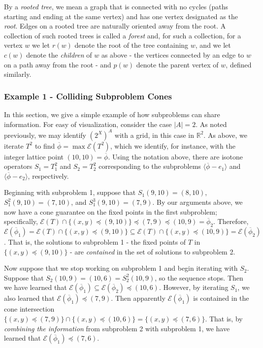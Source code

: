 \documentclass[11pt,reqno]{amsart}
\theoremstyle{definition}
\numberwithin{equation}{section}
\newcommand{\mr}{\mathbb{R}}
\newcommand{\ol}{\overline}
\newcommand{\lag}{\langle}
\newcommand{\rag}{\rangle}
\newcommand{\pre}{\phi}
\newcommand{\prealloc}{(2^X)^A}
\newcommand{\sub}{\subseteq}
\newcommand{\fix}{\mathcal{E}}
\newcommand{\peq}{\preceq}
\newcommand{\toppre}{\ol{\pre}}
\begin{document}
By a \emph{rooted tree}, we mean a graph that is connected with no cycles (paths starting and ending at the same vertex) and has one vertex designated as the \emph{root}. 
Edges on a rooted tree are naturally oriented away from the root. 
A collection of such rooted trees is called a \emph{forest} and, for such a collection, for a vertex $w$ we let $r(w)$ denote the root of the tree containing $w$, and we let $c(w)$ denote the \emph{children} of $w$ as above - the vertices connected by an edge to $w$ on a path away from the root - and $p(w)$ denote the parent vertex of $w$, defined similarly.  

\subsubsection{Example 1 - Colliding Subproblem Cones}
In this section, we give a simple example of how subproblems can share information.
For easy of visualization, consider the case $|A| = 2$. As noted previously, we may identify $\prealloc$ with a grid, in this case in $\mr^2$.
As above, we iterate $T^2$ to find $\toppre = \max \fix(T^2)$, which we identify, for instance, with the integer lattice point $(10,10) = \toppre$. 
Using the notation above, there are isotone operators $S_1 = T_1^2$ and $S_2 = T_2^2$ corresponding to the subproblems $\lag \toppre - e_1 \rag$ and $\lag \toppre - e_2 \rag$, respectively. 

Beginning with subproblem 1, suppose that $S_1 (9,10) = (8,10)$, $S_1^2 (9,10) = (7,10)$, and $S_1^3 (9,10) = (7,9)$.
By our arguments above, we now have a cone guarantee on the fixed points in the first subproblem; specifically, $\fix(T) \cap \{(x,y) \peq (9,10)\} \peq (7,9) \peq (10,9) = \toppre_2$.
Therefore, $\fix(\toppre_1) = \fix(T) \cap \{(x,y) \peq (9,10)\} \sub \fix(T) \cap \{(x,y) \peq (10,9)\} = \fix(\toppre_2)$. 
That is, the solutions to subproblem 1 - the fixed points of $T$ in $\{(x,y) \peq (9,10)\}$ - are \emph{contained} in the set of solutions to subproblem 2.  

Now suppose that we stop working on subproblem 1 and begin iterating with $S_2$.
Suppose that $S_2(10,9) = (10,6) = S_2^2(10,9)$, so the sequence stops.
Then we have learned that $\fix(\toppre_1) \sub \fix(\toppre_2) \peq (10,6)$. 
However, by iterating $S_1$, we also learned that $\fix(\toppre_1) \peq (7,9)$. 
Then apparently $\fix(\toppre_1)$ is contained in the cone intersection $\{(x,y) \peq (7,9)\} \cap \{(x,y) \peq (10, 6)\} = \{(x,y) \peq (7,6) \}$. 
That is, by \emph{combining the information} from subproblem 2 with subproblem 1, we have learned that $\fix(\toppre_1) \peq (7,6)$. 
\end{document}

